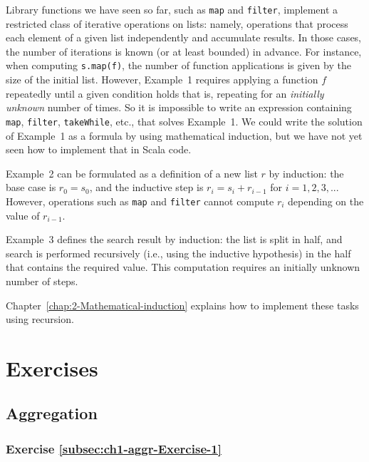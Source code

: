 Library functions we have seen so far, such as \texttt{}\lstinline!map!
and \lstinline!filter!, implement a restricted class of iterative
operations on lists: namely, operations that process each element
of a given list independently and accumulate results. In those cases,
the number of iterations is known (or at least bounded) in advance.
For instance, when computing \lstinline!s.map(f)!, the number of
function applications is given by the size of the initial list. However,
Example\ 1 requires applying a function $f$ repeatedly until a given
condition holds \textemdash{} that is, repeating for an \emph{initially
unknown} number of times. So it is impossible to write an expression
containing \lstinline!map!, \lstinline!filter!, \lstinline!takeWhile!,
etc., that solves Example\ 1. We could write the solution of Example\ 1
as a formula by using mathematical induction, but we have not yet
seen how to implement that in Scala code. 

Example\ 2 can be formulated as a definition of a new list $r$ by
induction: the base case is $r_{0}=s_{0}$, and the inductive step
is $r_{i}=s_{i}+r_{i-1}$ for $i=1,2,3,...$ However, operations such
as \texttt{}\lstinline!map! and \texttt{}\lstinline!filter! cannot
compute $r_{i}$ depending on the value of $r_{i-1}$.

Example\ 3 defines the search result by induction: the list is split
in half, and search is performed recursively (i.e., using the inductive
hypothesis) in the half that contains the required value. This computation
requires an initially unknown number of steps.

Chapter\ \ref{chap:2-Mathematical-induction} explains how to implement
these tasks using recursion.

\section{Exercises\label{sec:beginner-Exercises}}

\subsection{Aggregation}

\subsubsection{Exercise \label{subsec:ch1-aggr-Exercise-1}\ref{subsec:ch1-aggr-Exercise-1}}

